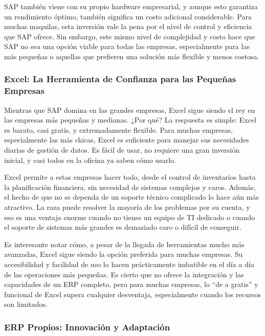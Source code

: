 \documentclass[
  10pt,
  letterpaper,
]{book}
\begin{document}
SAP también viene con su propio hardware empresarial, y aunque esto
garantiza un rendimiento óptimo, también significa un costo adicional
considerable. Para muchas maquilas, esta inversión vale la pena por el
nivel de control y eficiencia que SAP ofrece. Sin embargo, este mismo
nivel de complejidad y costo hace que SAP no sea una opción viable para
todas las empresas, especialmente para las más pequeñas o aquellas que
prefieren una solución más flexible y menos costosa.

\subsubsection{Excel: La Herramienta de Confianza para las Pequeñas
Empresas}\label{excel-la-herramienta-de-confianza-para-las-pequeuxf1as-empresas}

Mientras que SAP domina en las grandes empresas, Excel sigue siendo el
rey en las empresas más pequeñas y medianas. ¿Por qué? La respuesta es
simple: Excel es barato, casi gratis, y extremadamente flexible. Para
muchas empresas, especialmente las más chicas, Excel es suficiente para
manejar sus necesidades diarias de gestión de datos. Es fácil de usar,
no requiere una gran inversión inicial, y casi todos en la oficina ya
saben cómo usarlo.

Excel permite a estas empresas hacer todo, desde el control de
inventarios hasta la planificación financiera, sin necesidad de sistemas
complejos y caros. Además, el hecho de que no se dependa de un soporte
técnico complicado lo hace aún más atractivo. La raza puede resolver la
mayoría de los problemas por su cuenta, y eso es una ventaja enorme
cuando no tienes un equipo de TI dedicado o cuando el soporte de
sistemas más grandes es demasiado caro o difícil de conseguir.

Es interesante notar cómo, a pesar de la llegada de herramientas mucho
más avanzadas, Excel sigue siendo la opción preferida para muchas
empresas. Su accesibilidad y facilidad de uso lo hacen prácticamente
imbatible en el día a día de las operaciones más pequeñas. Es cierto que
no ofrece la integración y las capacidades de un ERP completo, pero para
muchas empresas, lo ``de a gratis'' y funcional de Excel supera
cualquier desventaja, especialmente cuando los recursos son limitados.

\subsubsection{ERP Propios: Innovación y
Adaptación}\label{erp-propios-innovaciuxf3n-y-adaptaciuxf3n}
\end{document}

